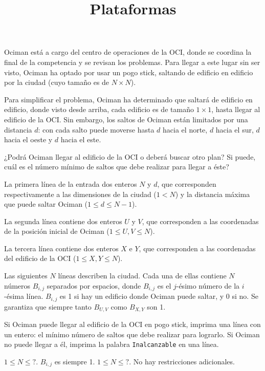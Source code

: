 \documentclass{oci}
\title{Plataformas}
\begin{document}
\begin{problemDescription}
Ociman está a cargo del centro de operaciones de la OCI, donde se coordina la final de la competencia y se revisan los problemas.
Para llegar a este lugar sin ser visto, Ociman ha optado por usar un pogo stick, saltando de edificio en edificio por la ciudad (cuyo tamaño es de $N \times N$).

Para simplificar el problema, Ociman ha determinado que saltará de edificio en edificio, donde visto desde arriba, cada edificio es de tamaño $1 \times 1$, hasta llegar al edificio de la OCI.
Sin embargo, los saltos de Ociman están limitados por una distancia $d$: con cada salto puede moverse hasta $d$ hacia el norte, $d$ hacia el sur, $d$ hacia el oeste y $d$ hacia el este.


¿Podrá Ociman llegar al edificio de la OCI o deberá buscar otro plan?
Si puede, cuál es el número mínimo de saltos que debe realizar para llegar a éste?

\end{problemDescription}

\begin{inputDescription}
La primera línea de la entrada dos enteros $N$ y $d$, que corresponden respectivamente a las dimensiones de la ciudad ($1 < N$) y la distancia máxima que puede saltar Ociman ($1 \le d \le N - 1$).

La segunda línea contiene dos enteros $U$ y $V$, que corresponden a las coordenadas de la posición inicial de Ociman ($1 \le U, V \le N$).

La tercera línea contiene dos enteros $X$ e $Y$, que corresponden a las coordenadas del edificio de la OCI ($1 \le X, Y \le N$).

Las siguientes $N$ líneas describen la ciudad.
Cada una de ellas contiene $N$ números $B_{i,j}$ separados por espacios, donde $B_{i,j}$ es el $j$-ésimo número de la $i$-ésima línea.
$B_{i,j}$ es 1 si hay un edificio donde Ociman puede saltar, y 0 si no.
Se garantiza que siempre tanto $B_{U,V}$ como $B_{X,Y}$ son 1.
\end{inputDescription}

\begin{outputDescription}
Si Ociman puede llegar al edificio de la OCI en pogo stick, imprima una línea con un entero: el mínimo número de saltos que debe realizar para lograrlo. Si Ociman no puede llegar a él, imprima la palabra \verb-Inalcanzable- en una línea.
\end{outputDescription}

\begin{scoreDescription}
   $1 \le N \le ?$. $B_{i,j}$ es siempre 1.
   $1 \le N \le ?$. No hay restricciones adicionales.
\end{scoreDescription}

\begin{sampleDescription}
\end{sampleDescription}
\end{document}
